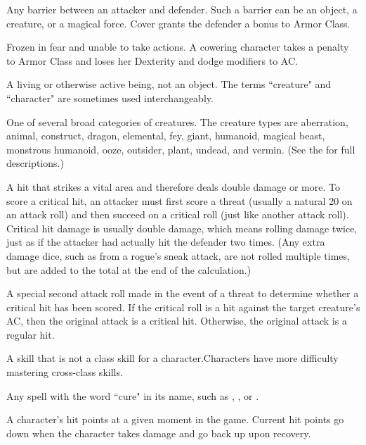  Any barrier between an attacker and defender. Such a 
barrier can be an object, a creature, or a magical force. Cover grants 
the defender a bonus to Armor Class. 

 Frozen in fear and unable to take actions. A cowering 
character takes a  penalty to Armor Class and loses her Dexterity 
and dodge modifiers to AC. 

 A living or otherwise active being, not an object. The 
terms ``creature" and ``character" are sometimes used interchangeably. 

 One of several broad categories of creatures. The 
creature types are aberration, animal, construct, dragon, elemental, 
fey, giant, humanoid, magical beast, monstrous humanoid, ooze, 
outsider, plant, undead, and vermin. (See the  for full 
descriptions.) 

 A hit that strikes a vital area and therefore deals 
double damage or more. To score a critical hit, an attacker must first 
score a threat (usually a natural 20 on an attack roll) and then 
succeed on a critical roll (just like another attack roll). Critical hit 
damage is usually double damage, which means rolling damage 
twice, just as if the attacker had actually hit the defender two times. 
(Any extra damage dice, such as from a rogue's sneak attack, are not 
rolled multiple times, but are added to the total at the end of the 
calculation.) 

 A special second attack roll made in the event of a 
threat to determine whether a critical hit has been scored. If the 
critical roll is a hit against the target creature's AC, then the original 
attack is a critical hit. Otherwise, the original attack is a regular hit. 

 A skill that is not a class skill for a character.Characters have more difficulty mastering cross-class skills.

 Any spell with the word ``cure" in its name, such as 
, , or . 

 A character's hit points at a given moment in 
the game. Current hit points go down when the character takes 
damage and go back up upon recovery. 

